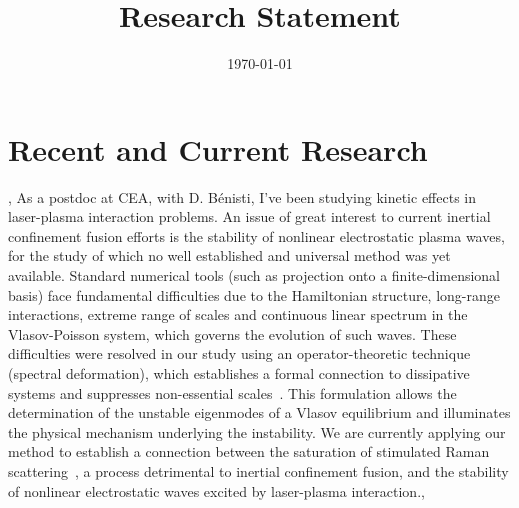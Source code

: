 \documentclass[11pt,a4paper,final]{moderncv}
\title{Research Statement}               %
\date{\today}
\begin{document}



\section{Recent and Current Research}
\sep
{}
As a postdoc at CEA, with D. B\'enisti, I've been studying kinetic 
effects in laser-plasma interaction problems. An issue of great
interest to current inertial confinement fusion efforts is the stability 
of nonlinear electrostatic plasma waves, for the study of which no well established 
and universal method was yet available. 
Standard numerical tools (such as projection onto a finite-dimensional basis) 
face fundamental difficulties due to the Hamiltonian structure, 
long-range interactions, extreme range of scales and continuous linear spectrum 
in the Vlasov-Poisson system, which governs the evolution of such waves. 
These difficulties were resolved in our study using 
an operator-theoretic technique (spectral deformation), 
which establishes a formal connection to dissipative systems and suppresses 
non-essential scales~\cite{siminos11}. This formulation allows the determination 
of the unstable eigenmodes of a Vlasov equilibrium and illuminates 
the physical mechanism underlying the instability.
We are currently applying our method to establish a connection between 
the saturation of stimulated Raman scattering~\cite{benisti10-1}, 
a process detrimental to inertial confinement fusion,
and the stability of nonlinear electrostatic waves excited by laser-plasma
interaction.\sep
\end{document}
